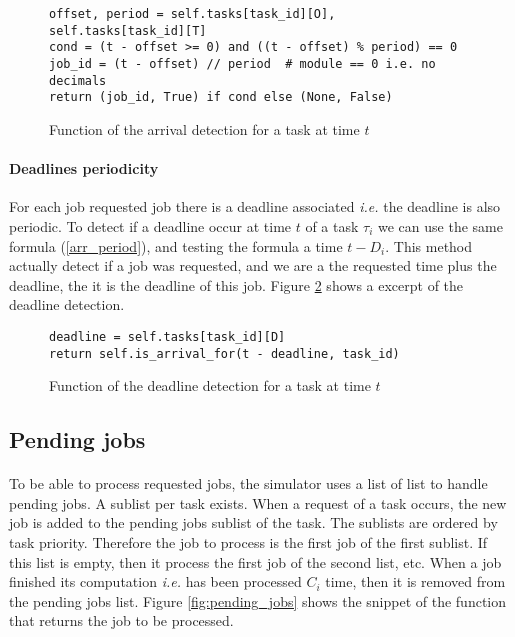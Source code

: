 \documentclass[letterpaper]{article}
\begin{document}
\begin{figure}[H]
    \begin{lstlisting}
offset, period = self.tasks[task_id][O], self.tasks[task_id][T]
cond = (t - offset >= 0) and ((t - offset) % period) == 0
job_id = (t - offset) // period  # module == 0 i.e. no decimals
return (job_id, True) if cond else (None, False)
    \end{lstlisting}
    \caption{Function of the arrival detection for a task at time $t$}
    \label{fig:arrival_for}
\end{figure}

\paragraph{Deadlines periodicity}

For each job requested job there is a deadline associated \textit{i.e.}
the deadline is also periodic. To detect if a deadline occur at time $t$
of a task $\tau_i$ we can use the same formula (\ref{arr_period}), and
testing the formula a time $t - D_i$. This method actually detect if
a job was requested, and we are a the requested time plus the deadline, the
it is the deadline of this job. Figure \ref{fig:deadline_for} shows
a excerpt of the deadline detection.

\begin{figure}[H]
    \begin{lstlisting}
deadline = self.tasks[task_id][D]
return self.is_arrival_for(t - deadline, task_id)
    \end{lstlisting}

    \caption{Function of the deadline detection for a task at time $t$}
    \label{fig:deadline_for}
\end{figure}


\subsection{Pending jobs}

\paragraph{} To be able to process requested jobs, the simulator uses a list
of list to handle pending jobs. A sublist per task exists. When a request
of a task occurs, the new job is added to the pending jobs sublist of the
task.
The sublists are ordered by task priority. Therefore the job to process
is the first job of the first sublist. If this list is empty, then
it process the first job of the second list, etc. When a job finished its
computation \textit{i.e.} has been processed $C_i$ time, then it is removed
from the pending jobs list. Figure \ref{fig:pending_jobs} shows the snippet
of the function that returns the job to be processed.
\end{document}
